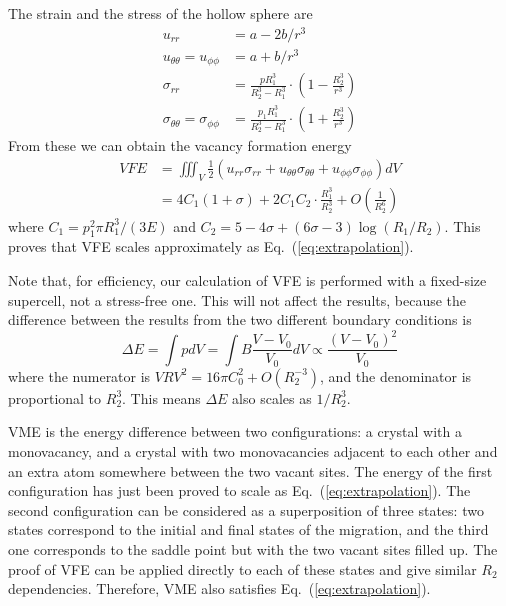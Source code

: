 \documentclass[%
 reprint,
 amsmath,amssymb,
 aps,
]{revtex4-1}
\begin{document}
The strain and the stress of the hollow sphere are
\begin{align}
u_{rr} &= a - 2b/r^3\\
u_{\theta\theta} = u_{\phi\phi} &= a + b/r^3\\
\sigma_{rr} &= \frac{pR_1^3}{R_2^3-R_1^3}\cdot \left(1-\frac{R_2^3}{r^3}\right)\\
\sigma_{\theta\theta}=\sigma_{\phi\phi} &= \frac{p_1R_1^3}{R_2^3-R_1^3}\cdot\left(1+\frac{R_2^3}{r^3}\right)
\end{align}
From these we can obtain the vacancy formation energy
\begin{equation}
\label{eq:VFEProof}
\begin{split}
\mathit{VFE} & = \iiint_V \frac{1}{2} \left(u_{rr}\sigma_{rr} + u_{\theta\theta}\sigma_{\theta\theta} + u_{\phi\phi}\sigma_{\phi\phi}\right) dV\\
 & = 4C_1(1+\sigma)
 + 2C_1 C_2 \cdot\frac{R_1^3}{R_2^3}
 + O\left(\frac{1}{R_2^6}\right)
\end{split}
\end{equation}
where $C_1=p_1^2\pi R_1^3/(3E)$ and $C_2 = 5-4\sigma+(6\sigma-3) \log\left(R_1/R_2\right)$.
This proves that VFE scales approximately as Eq.~(\ref{eq:extrapolation}).

Note that, for efficiency, our calculation of VFE is performed with a fixed-size supercell, not a stress-free one.
This will not affect the results, because the difference between the results from the two different boundary conditions is
\begin{equation}
\Delta E=\int pdV=\int B \frac{V-V_0}{V_0}dV\propto\frac{(V-V_0)^2}{V_0}
\end{equation}
where the numerator is $\mathit{VRV}^2=16\pi C_0^2+O(R_2^{-3})$, and the denominator is proportional to $R_2^3$.
This means $\Delta E$ also scales as $1/R_2^3$.

VME is the energy difference between two configurations:
a crystal with a monovacancy, and a crystal with two monovacancies adjacent to each other and an extra atom somewhere between the two vacant sites.
The energy of the first configuration has just been proved to scale as Eq.~(\ref{eq:extrapolation}).
The second configuration can be considered as a superposition of three states:
two states correspond to the initial and final states of the migration, and the third one corresponds to the saddle point but with the two vacant sites filled up.
The proof of VFE can be applied directly to each of these states and give similar $R_2$ dependencies.
Therefore, VME also satisfies Eq.~(\ref{eq:extrapolation}).
\end{document}
